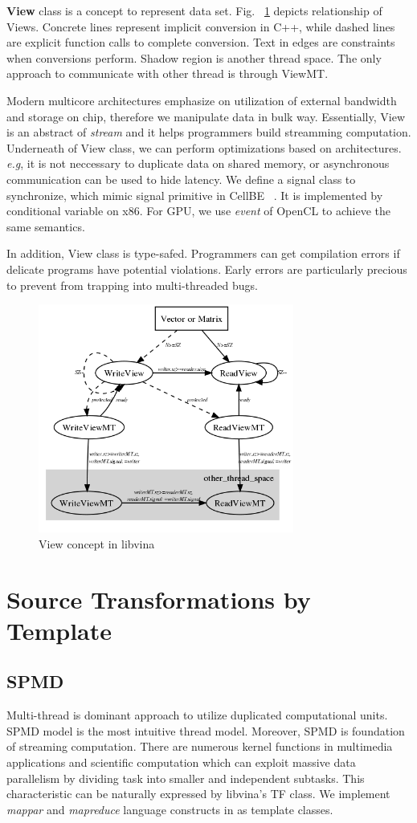 \documentclass[10pt, conference, compsocconf]{IEEEtran}
\begin{document}
\textbf{View} class is a concept to represent data set.  Fig. ~\ref{fig:view} depicts relationship of Views. Concrete lines
represent implicit conversion in C++, while  dashed lines are explicit
function calls to complete conversion. Text in edges are constraints
when conversions perform. Shadow region is another thread space. The only approach to
communicate with other thread is through ViewMT.  

Modern multicore architectures emphasize on utilization of external
bandwidth and storage on chip, therefore we manipulate data in
bulk way. Essentially, View is an abstract of \emph{stream} and it
helps programmers build streamming computation. Underneath of View
class, we can perform optimizations based on architectures. \textit{e.g}, it is not neccessary to duplicate
data  on shared memory, or  asynchronous communication can be used to
hide latency. We define a signal class to synchronize, which mimic
signal primitive in CellBE ~\cite{b19}. It is implemented by
conditional variable on x86. For GPU, we use \emph{event} of OpenCL to achieve the
same semantics.

In addition,  View class is type-safed. Programmers can get compilation errors if delicate
programs have potential violations. Early errors are particularly
precious to prevent from trapping into multi-threaded bugs.

\begin{figure}
\includegraphics[width=3.3in]{view_concept}
\caption{View concept in libvina}
\label{fig:view}
\end{figure}
\section{Source Transformations by Template}
\subsection{SPMD}
Multi-thread is dominant approach to utilize duplicated computational
units. SPMD model is the most intuitive thread model. Moreover,  SPMD is foundation of
streaming computation. There are numerous kernel functions in
multimedia applications and scientific computation which can 
exploit massive  data parallelism by dividing task into smaller and independent
subtasks. This characteristic can be naturally expressed by libvina's
TF class. We implement \emph{mappar} and \emph{mapreduce} language constructs in \cite{b1} as template classes.
\end{document}
